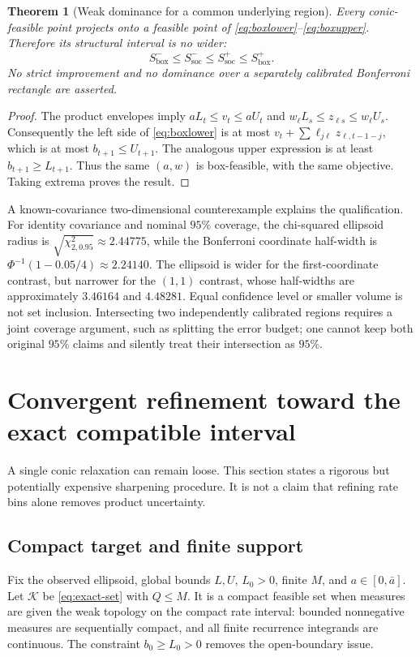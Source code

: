 \documentclass[11pt,a4paper]{article}
\newtheorem{theorem}{Theorem}[section]
\theoremstyle{definition}\newtheorem{definition}[theorem]{Definition}
\theoremstyle{remark}\newtheorem{remark}[theorem]{Remark}
\newcommand{\mc}{\mathcal}
\begin{document}
\begin{theorem}[Weak dominance for a common underlying region]\label{thm:dominance}
Every conic-feasible point projects onto a feasible point of \eqref{eq:boxlower}--\eqref{eq:boxupper}. Therefore its structural interval is no wider:
\[
 S_{\mathrm{box}}^-\le S_{\mathrm{soc}}^-\le S_{\mathrm{soc}}^+\le S_{\mathrm{box}}^+.
\]
No strict improvement and no dominance over a separately calibrated Bonferroni rectangle are asserted.
\end{theorem}
\begin{proof}
The product envelopes imply
$aL_t\le v_t\le aU_t$ and
$w_\ell L_s\le z_{\ell s}\le w_\ell U_s$.
Consequently the left side of \eqref{eq:boxlower} is at most
$v_t+\sum\ell_{j\ell}z_{\ell,t-1-j}$, which is at most $b_{t+1}\le U_{t+1}$. The analogous upper expression is at least $b_{t+1}\ge L_{t+1}$. Thus the same $(a,w)$ is box-feasible, with the same objective. Taking extrema proves the result.
\end{proof}

A known-covariance two-dimensional counterexample explains the qualification. For identity covariance and nominal $95\%$ coverage, the chi-squared ellipsoid radius is
$\sqrt{\chi^2_{2,0.95}}\approx2.44775$, while the Bonferroni coordinate half-width is
$\Phi^{-1}(1-0.05/4)\approx2.24140$. The ellipsoid is wider for the first-coordinate contrast, but narrower for the $(1,1)$ contrast, whose half-widths are approximately $3.46164$ and $4.48281$. Equal confidence level or smaller volume is not set inclusion. Intersecting two independently calibrated regions requires a joint coverage argument, such as splitting the error budget; one cannot keep both original $95\%$ claims and silently treat their intersection as $95\%$.

\section{Convergent refinement toward the exact compatible interval}
A single conic relaxation can remain loose. This section states a rigorous but potentially expensive sharpening procedure. It is not a claim that refining rate bins alone removes product uncertainty.

\subsection{Compact target and finite support}
Fix the observed ellipsoid, global bounds $L,U$, $L_0>0$, finite $M$, and $a\in[0,\bar a]$. Let $\mc K$ be \eqref{eq:exact-set} with $Q\le M$. It is a compact feasible set when measures are given the weak topology on the compact rate interval: bounded nonnegative measures are sequentially compact, and all finite recurrence integrands are continuous. The constraint $b_0\ge L_0>0$ removes the open-boundary issue.
\end{document}
